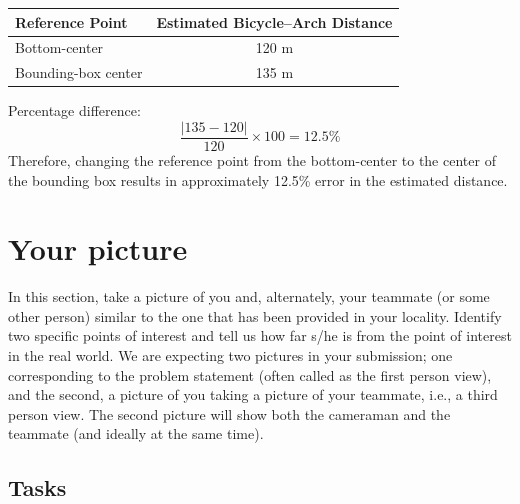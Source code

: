 \documentclass[12pt,a4paper]{article}
\newenvironment{studentSpace}{\par\medskip\noindent}{\par\bigskip}
\begin{document}
\begin{studentSpace}
\medskip
\begin{center}
\begin{tabular}{lc}
\toprule
Reference Point & Estimated Bicycle--Arch Distance \\
\midrule
Bottom-center       & 120 m \\
Bounding-box center & 135 m \\
\bottomrule
\end{tabular}
\end{center}
\medskip

Percentage difference:
\[
\frac{|135 - 120|}{120} \times 100 = 12.5\%
\]
Therefore, changing the reference point from the bottom-center to the center of the bounding box results in approximately 12.5\% error in the estimated distance.

\end{studentSpace}

\section{Your picture}

In this section, take a picture of you and, alternately, your teammate
(or some other person) similar to the one that has been provided in
your locality. Identify two specific points of interest and tell us
how far s/he is from the point of interest in the real world. We are
expecting two pictures in your submission; one corresponding to the
problem statement (often called as the first person view), and the
second, a picture of you taking a picture of your teammate, i.e., a
third person view. The second picture will show both the cameraman and
the teammate (and ideally at the same time).

\subsection{Tasks}
\end{document}

